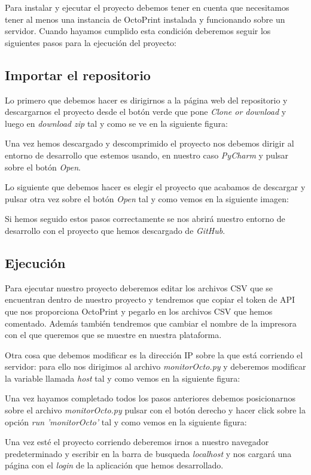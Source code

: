 Para instalar y ejecutar el proyecto debemos tener en cuenta que necesitamos tener al menos una instancia de OctoPrint instalada y funcionando sobre un servidor. 
Cuando hayamos cumplido esta condición deberemos seguir los siguientes pasos para la ejecución del proyecto:

\subsection{Importar el repositorio}

Lo primero que debemos hacer es dirigirnos a la página web \cite{repositorio} del repositorio y descargarnos el proyecto desde el botón verde que pone \textit{Clone or download}  y luego en \textit{download zip} tal y como se ve en la siguiente figura:


Una vez hemos descargado y descomprimido el proyecto nos debemos dirigir al entorno de desarrollo que estemos usando, en nuestro caso \textit{PyCharm} y pulsar sobre el botón \textit{Open}.


Lo siguiente que debemos hacer es elegir el proyecto que acabamos de descargar y pulsar otra vez sobre el botón \textit{Open}  tal y como vemos en la siguiente imagen:


Si hemos seguido estos pasos correctamente se nos abrirá nuestro entorno de desarrollo con el proyecto que hemos descargado de \textit{GitHub}.

\subsection{Ejecución}

Para ejecutar nuestro proyecto deberemos editar los archivos CSV que se encuentran dentro de nuestro proyecto y tendremos que copiar el token de API que nos proporciona OctoPrint y pegarlo en los archivos CSV que hemos comentado. Además también tendremos que cambiar el nombre de la impresora con el que queremos que se muestre en nuestra plataforma.

Otra cosa que debemos modificar es la dirección IP sobre la que está corriendo el servidor: para ello nos dirigimos al archivo \textit{monitorOcto.py} y deberemos modificar la variable llamada \textit{host} tal y como vemos en la siguiente figura:



Una vez hayamos completado todos los pasos anteriores debemos posicionarnos sobre el archivo \textit{monitorOcto.py} pulsar con el botón derecho y hacer click sobre la opción \textit{run 'monitorOcto'} tal y como vemos en la siguiente figura:


Una vez esté el proyecto corriendo deberemos irnos a nuestro navegador predeterminado y escribir en la barra de busqueda \textit{localhost} y nos cargará una página con el \textit{login} de la aplicación que hemos desarrollado.

